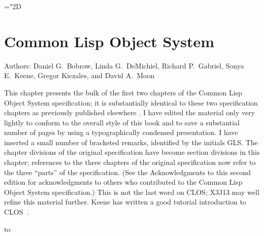 
\clearpage\def\pagestatus{FINAL PROOF}



\ifx \rulang\Undef
  \def\CLOS{Common Lisp Object System}
  \def\OS{Object System}
\else %
  \def\CLOS{Объектная система Common Lisp'а}
  \def\OS{Объектная система}
\fi

\def\sub{_}

\mathchardef\mhyphen="2D

\ifx \rulang\Undef

\chapter{Common Lisp Object System}
\label{CLOS}

Authors: Daniel G.~Bobrow, Linda G.~DeMichiel,
Richard P.~Gabriel, Sonya E.~Keene, Gregor Kiczales,
and David A.~Moon


This chapter presents the bulk of the first two chapters of the
Common Lisp Object System specification; it is substantially
identical to these two specification chapters as previously published elsewhere
\cite{SIGPLAN-CLOS,LASC-CLOS-PART-1,LASC-CLOS-PART-2}.
I have edited the material only very lightly
to conform to the overall style of this book and to save a substantial
number of pages by using a typographically condensed presentation.
I have inserted a small
number of bracketed remarks, identified by the initials GLS.
The chapter divisions of the original specification have become
section divisions in this chapter; references to the three chapters
of the original specification now refer to the three ``parts'' of the
specification.
(See the Acknowledgments to this second edition for
acknowledgments to others who contributed to the Common Lisp Object System specification.)
This is not the last word on CLOS;
X3J13 may well refine this material further.
Keene has written a good tutorial introduction to CLOS~\cite{KEENE}.

\noindent\hbox to \textwidth{\hss---Guy L. Steele Jr.}

